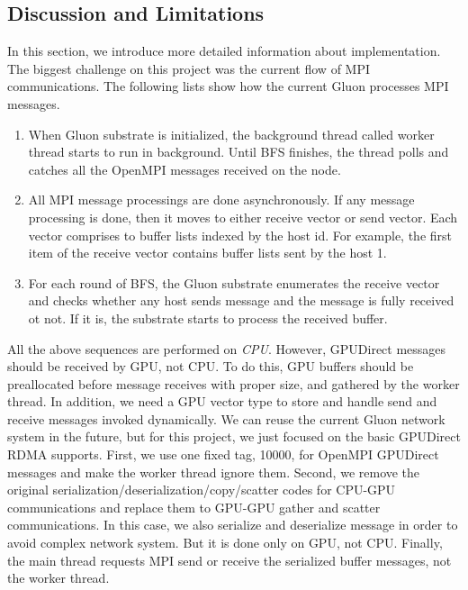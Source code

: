 \subsection{Discussion and Limitations}
In this section, we introduce more detailed information about implementation.
The biggest challenge on this project was the current flow of MPI communications.
The following lists show how the current Gluon processes MPI messages. 
\begin{enumerate}
\item When Gluon substrate is initialized, the background thread called worker thread starts to run in background.
Until BFS finishes, the thread polls and catches all the OpenMPI messages received on the node.
\item All MPI message processings are done asynchronously.
If any message processing is done, then it moves to either receive vector or send vector.
Each vector comprises to buffer lists indexed by the host id. For example, the first item of the receive vector
contains buffer lists sent by the host 1.
\item For each round of BFS, the Gluon substrate enumerates the receive vector and checks whether any host sends 
message and the message is fully received ot not.
If it is, the substrate starts to process the received buffer. 
\end{enumerate}

All the above sequences are performed on \textit{CPU}.
However, GPUDirect messages should be received by GPU, not CPU.
To do this, GPU buffers should be preallocated before message receives with proper size, and 
gathered by the worker thread.
In addition, we need a GPU vector type to store and handle send and receive messages invoked dynamically. 
We can reuse the current Gluon network system in the future, but for this project, 
we just focused on the basic GPUDirect RDMA supports.
First, we use one fixed tag, 10000, for OpenMPI GPUDirect messages and make the worker thread ignore them.
Second, we remove the original serialization/deserialization/copy/scatter codes for CPU-GPU communications and 
replace them to GPU-GPU gather and scatter communications. In this case, we also serialize and deserialize 
message in order to avoid complex network system. But it is done only on GPU, not CPU.
Finally, the main thread requests MPI send or receive the serialized buffer messages, not the worker thread.

